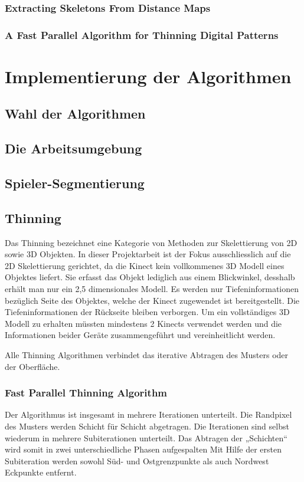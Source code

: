 \documentclass[appendixprefix,a4paper,bibliography=totoc,twoside=true,11pt,DIV=11,BCOR=6mm,headsepline,pointlessnumbers]{scrbook}
\begin{document}
\subsection{Extracting Skeletons From Distance Maps}
\subsection{A Fast Parallel Algorithm for Thinning Digital Patterns} 


\chapter{Implementierung der Algorithmen}
\section{Wahl der Algorithmen}
\section{Die Arbeitsumgebung}
\section{Spieler-Segmentierung}
\section{Thinning}

Das Thinning bezeichnet eine Kategorie von Methoden zur Skelettierung von 2D sowie 3D Objekten. In dieser Projektarbeit ist der Fokus ausschliesslich auf die 2D Skelettierung gerichtet, da die Kinect kein vollkommenes 3D Modell eines Objektes liefert. Sie erfasst das Objekt lediglich aus einem Blickwinkel, desshalb erhält man nur ein 2,5 dimensionales Modell. Es werden nur Tiefeninformationen bezüglich Seite des Objektes, welche der Kinect zugewendet ist bereitgestellt. Die  Tiefeninformationen der Rückseite bleiben verborgen. Um ein vollständiges 3D Modell zu erhalten müssten mindestens 2 Kinects verwendet werden und die Informationen beider Geräte zusammengeführt und vereinheitlicht werden. 

Alle Thinning Algorithmen verbindet das iterative Abtragen des Musters oder der Oberfläche.

\subsection{Fast Parallel Thinning Algorithm}
Der Algorithmus ist insgesamt in mehrere Iterationen unterteilt. Die Randpixel des Musters werden Schicht für Schicht abgetragen. Die Iterationen sind selbst wiederum in mehrere Subiterationen unterteilt. Das Abtragen der „Schichten“ wird somit in zwei unterschiedliche Phasen aufgespalten
Mit Hilfe der ersten Subiteration werden sowohl Süd- und Ostgrenzpunkte als auch Nordwest Eckpunkte entfernt. \\
\end{document}
